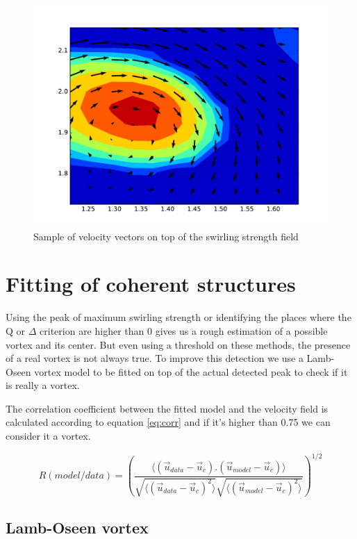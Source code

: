 \documentclass[12pt, a4paper, openany]{memoir}
\begin{document}
\begin{figure}[h]
	\centering
	\includegraphics[scale=0.6]{figure/dns_quiver1.pdf}
	\caption{Sample of velocity vectors on top of the swirling strength field}
	\label{fig:quiverDNS1}
\end{figure} 

\section{Fitting of coherent structures}

Using the peak of maximum swirling strength or identifying the places where the Q or $\Delta$ criterion are higher than 0 gives us a rough estimation of a possible vortex and its center. But even using a threshold on these methods, the presence of a real vortex is not always true. To improve this detection we use a Lamb-Oseen vortex model to be fitted on top of the actual detected peak to check if it is really a vortex. 

The correlation coefficient between the fitted model and the velocity field is calculated according to equation \ref{eq:corr} and if it's higher than 0.75 we can consider it a vortex.

\begin{equation}
\label{eq:corr}
R(model/data) = \left( \frac{\langle (\vec{u}_{data}-\vec{u}_c).(\vec{u}_{model}-\vec{u}_c)\rangle }
{\sqrt{\langle (\vec{u}_{data}-\vec{u}_c)^2\rangle} \sqrt{\langle (\vec{u}_{model}-\vec{u}_c)^2\rangle}} \right)^{1/2}
\end{equation}

\subsection{Lamb-Oseen vortex}
\end{document}
